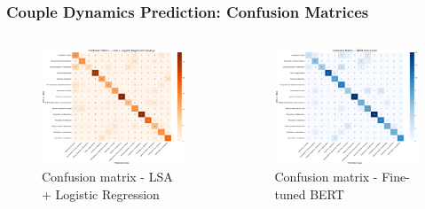 \documentclass[aspectratio=169,xcolor=dvipsnames]{beamer}
\begin{document}
\begin{frame}
\frametitle{Couple Dynamics Prediction: Confusion Matrices}

\begin{columns}[c]
    \begin{figure}
    \centering
    \includegraphics[width=\linewidth]{figures/lsa_logreg_confusion_matrix.png}
    \caption{Confusion matrix - LSA + Logistic Regression}
    \end{figure}
    \begin{figure}
    \centering
    \includegraphics[width=\linewidth]{figures/bert_finetuned_confusion_matrix.png}
    \caption{Confusion matrix - Fine-tuned BERT}
    \end{figure}
\end{columns}

\end{frame}
\end{document}
